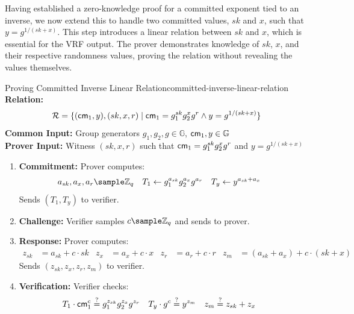 Having established a zero-knowledge proof for a committed exponent tied to an inverse, we now extend this to handle two committed values, $sk$ and $x$, such that $y = g^{1/(sk + x)}$. This step introduces a linear relation between $sk$ and $x$, which is essential for the VRF output. The prover demonstrates knowledge of $sk$, $x$, and their respective randomness values, proving the relation without revealing the values themselves.


\begin{protocol}{Proving Committed Inverse Linear Relation}{committed-inverse-linear-relation}\label{pok-committed-inverse-linear-relation}
\textbf{Relation: }
\[
\mathcal{R} = \{(\mathsf{cm}_1, y), (sk, x, r) \mid \mathsf{cm}_1 = g_1^{sk} g_2^{x} g^{r} \wedge y = g^{1/(sk + x)}\}
\]
\textbf{Common Input:} Group generators $g_1, g_2, g \in \mathbb{G}$, $\mathsf{cm}_1, y \in \mathbb{G}$ \\
\textbf{Prover Input:} Witness $(sk, x, r)$ such that $\mathsf{cm}_1 = g_1^{sk} g_2^{x} g^{r}$ and $ y = g^{1/(sk + x)}$
\begin{enumerate}
    \item \textbf{Commitment:} Prover computes:
    \begin{align*}
        a_{sk}, a_x, a_r &\sample \Z_q & T_1 &\gets g_1^{a_{sk}} g_2^{a_x} g^{a_r} & T_y &\gets y^{a_{sk} + a_x}
    \end{align*}
    Sends $(T_1, T_y)$ to verifier.
    
    \item \textbf{Challenge:} Verifier samples $c \sample \mathbb{Z}_q$ and sends to prover.
    
    \item \textbf{Response:} Prover computes:
     \begin{align*}
        z_{sk} &= a_{sk} + c \cdot sk & z_x &= a_x + c \cdot x & z_r &= a_r + c \cdot r & z_m &= (a_{sk} + a_x) + c \cdot (sk + x)
    \end{align*}
    Sends $(z_{sk}, z_x, z_r, z_m)$ to verifier.
    
    \item \textbf{Verification:} Verifier checks:
    \begin{align*}
        T_1 \cdot \mathsf{cm}_1^c &\stackrel{?}{=} g_1^{z_{sk}} g_2^{z_x} g^{z_r} &
        T_y \cdot g^c &\stackrel{?}{=} y^{z_m} &
        z_m &\stackrel{?}{=} z_{sk} + z_x
    \end{align*}
\end{enumerate}
\end{protocol}





